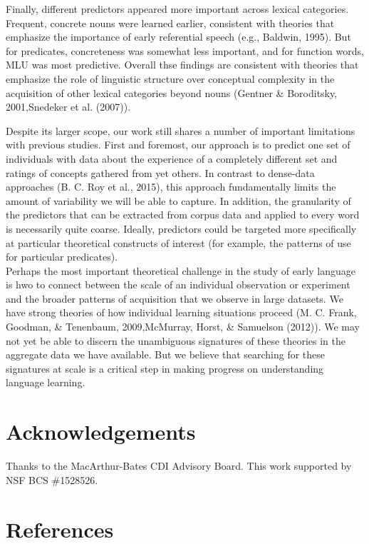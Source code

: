 \documentclass[10pt, letterpaper]{article}
\begin{document}
Finally, different predictors appeared more important across lexical
categories. Frequent, concrete nouns were learned earlier, consistent
with theories that emphasize the importance of early referential speech
(e.g., Baldwin, 1995). But for predicates, concreteness was somewhat
less important, and for function words, MLU was most predictive. Overall
thse findings are consistent with theories that emphasize the role of
linguistic structure over conceptual complexity in the acquisition of
other lexical categories beyond nouns (Gentner \& Boroditsky,
2001,Snedeker et al. (2007)).

Despite its larger scope, our work still shares a number of important
limitations with previous studies. First and foremost, our approach is
to predict one set of individuals with data about the experience of a
completely different set and ratings of concepts gathered from yet
others. In contrast to dense-data approaches (B. C. Roy et al., 2015),
this approach fundamentally limits the amount of variability we will be
able to capture. In addition, the granularity of the predictors that can
be extracted from corpus data and applied to every word is necessarily
quite coarse. Ideally, predictors could be targeted more specifically at
particular theoretical constructs of interest (for example, the patterns
of use for particular predicates).\\Perhaps the most important
theoretical challenge in the study of early language is hwo to connect
between the scale of an individual observation or experiment and the
broader patterns of acquisition that we observe in large datasets. We
have strong theories of how individual learning situations proceed (M.
C. Frank, Goodman, \& Tenenbaum, 2009,McMurray, Horst, \& Samuelson
(2012)). We may not yet be able to discern the unambiguous signatures of
these theories in the aggregate data we have available. But we believe
that searching for these signatures at scale is a critical step in
making progress on understanding language learning.

\section{Acknowledgements}\label{acknowledgements}

Thanks to the MacArthur-Bates CDI Advisory Board. This work supported by
NSF BCS \#1528526.

\section{References}\label{references}
\end{document}

